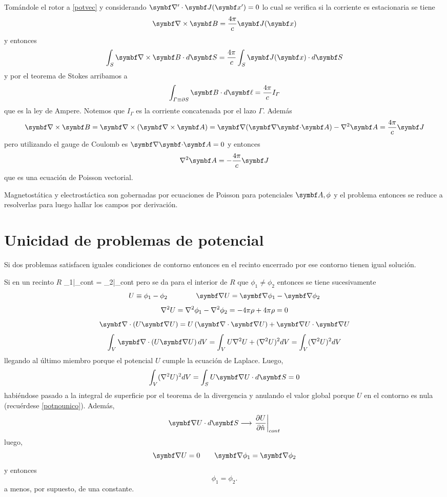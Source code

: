 \documentclass[10pt,oneside]{CBFT_book}
\begin{document}
Tomándole el rotor a \eqref{potvec} y considerando $\Nabla'\cdot\vb{J}(\vb{x}')=0$ lo cual se verifica si
la corriente es estacionaria se tiene 
\[
	\rotorm{B} = \frac{4\pi}{c} \vb{J}(\vb{x})
\]
y entonces
\[
	\int_S \rotorm{B} \cdot d\vb{S} = \frac{4\pi}{c} \int_S \vb{J}(\vb{x}) \cdot d\vb{S}
\]
y por el teorema de Stokes arribamos a
\[
	\int_{\Gamma\equiv\partial S} \vb{B}\cdot d\vb{\ell} = \frac{4\pi}{c} I_\Gamma
\]
que es la ley de Ampere. Notemos que $I_\Gamma$ es la corriente concatenada por el lazo $\Gamma$.
Además
\[
	\rotorm{B} = \Nabla\times(\rotorm{A}) = \Nabla(\divem{A}) - \nabla^2 \vb{A} = \frac{4\pi}{c}\vb{J}
\]
pero utilizando el gauge de Coulomb es $\divem{A}=0$ y entonces
\[
	\nabla^2 \vb{A} = -\frac{4\pi}{c}\vb{J}
\]
que es una ecuación de Poisson vectorial.

Magnetostática y electrostáctica son gobernadas por ecuaciones de Poisson para potenciales $\vb{A},\phi$ y
el problema entonces se reduce a resolverlas para luego hallar los campos por derivación.

\section{Unicidad de problemas de potencial}

Si dos problemas satisfacen iguales condiciones de contorno entonces en el recinto encerrado por
ese contorno tienen igual solución.

Si en un recinto $R$
\be
	\phi_1|_{cont} = \phi_2|_{cont}
	\label{potnounico}
\ee
pero se da para el interior de $R$ que $\phi_1\neq\phi_2$ entonces se tiene sucesivamente
\[
	U \equiv \phi_1 - \phi_2 \qquad \qquad \Nabla U = \Nabla \phi_1 - \Nabla \phi_2
\]
\[
	\nabla^2{U} = \nabla^2{\phi_1} - \nabla^2{\phi_2} = -4\pi \rho + 4\pi\rho = 0
\]
\[
	\Nabla\cdot\left( U\Nabla U \right) = U\left( \Nabla\cdot\Nabla U \right) + \Nabla U \cdot \Nabla U
\]
\[
	\int_V \Nabla\cdot\left( U\Nabla U \right) dV = \int_V U \lapm{U}  + (\lapm{U})^2 dV =  \int_V (\lapm{U})^2 dV
\]
llegando al último miembro porque el potencial $U$ cumple la ecuación de Laplace. Luego,
\[
	\int_V (\lapm{U})^2 dV = \int_S U\Nabla{U} \cdot d\vb{S} = 0
\]
habiéndose pasado a la integral de superficie por el teorema de la divergencia y anulando el valor global porque 
$U$ en el contorno es nula (recuérdese \eqref{potnounico}). Además, 
\[
	\Nabla{U} \cdot d\vb{S}  \longrightarrow \left.\dpar{U}{\hat{n}}\right|_{cont}
\]
luego,
\[
	\Nabla U = 0 \qquad \Nabla\phi_1 = \Nabla\phi_2 
\]
y entonces
\[
	\phi_1 = \phi_2 .
\]
a menos, por supuesto, de una constante.



\end{document}
